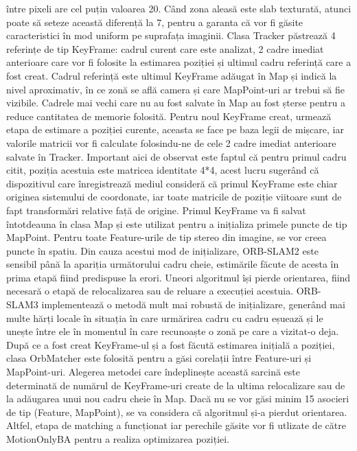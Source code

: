 \documentclass[12pt,a4paper]{report}
\begin{document}
între pixeli are cel puțin valoarea 20. Când zona aleasă este slab texturată, atunci poate să seteze
această diferență la 7, pentru a garanta că vor fi găsite caracteristici în mod uniform pe suprafața imaginii. Clasa 
Tracker păstrează 4 referințe de tip KeyFrame: cadrul curent care este analizat, 2 cadre imediat 
anterioare care vor fi folosite la estimarea poziției și ultimul cadru referință care a fost creat.
Cadrul referință este ultimul KeyFrame adăugat în Map și indică la nivel aproximativ, în ce 
zonă se află camera și care MapPoint-uri ar trebui să fie vizibile. Cadrele mai vechi care nu au 
fost salvate în Map au fost șterse pentru a reduce cantitatea de memorie folosită. Pentru noul
KeyFrame creat, urmează etapa de estimare a poziției curente, aceasta se face pe baza legii 
de mișcare, iar valorile matricii vor fi calculate folosindu-ne de cele 2 cadre imediat anterioare salvate în Tracker.
Important aici de observat este faptul că pentru primul cadru citit, poziția acestuia este matricea identitate
4*4, acest lucru sugerând că dispozitivul care înregistrează mediul consideră că primul KeyFrame
este chiar originea sistemului de coordonate, iar toate matricile de poziție viitoare sunt de fapt
transformări relative față de origine. Primul KeyFrame va fi salvat întotdeauna în clasa Map și 
este utilizat pentru a inițializa primele puncte de tip MapPoint. Pentru toate Feature-urile de 
tip stereo din imagine, se vor creea puncte în spatiu. Din cauza acestui mod de inițializare, 
ORB-SLAM2 este sensibil până la apariția următorului cadru cheie, estimările făcute de acesta 
în prima etapă fiind predispuse la erori. Uneori algoritmul își pierde orientarea, fiind
necesară o etapă de relocalizarea sau de reluare a execuției acestuia. ORB-SLAM3 implementează 
o metodă mult mai robustă de inițializare, generând mai multe hărți locale în situația în care
urmărirea cadru cu cadru eșuează și le unește între ele în momentul în care recunoaște o zonă pe 
care a vizitat-o deja. După ce a fost creat KeyFrame-ul și a fost făcută estimarea inițială a 
poziției, clasa OrbMatcher este folosită pentru a găsi corelații între Feature-uri și MapPoint-uri.
Alegerea metodei care îndeplinește această sarcină este determinată de numărul de KeyFrame-uri 
create de la ultima relocalizare sau de la adăugarea unui nou cadru cheie în Map. Dacă nu se 
vor găsi minim 15 asocieri de tip (Feature, MapPoint), se va considera că algoritmul și-a pierdut orientarea.
Altfel, etapa de matching a funcționat iar perechile găsite vor fi utlizate de către MotionOnlyBA pentru a realiza optimizarea poziției.
\end{document}
